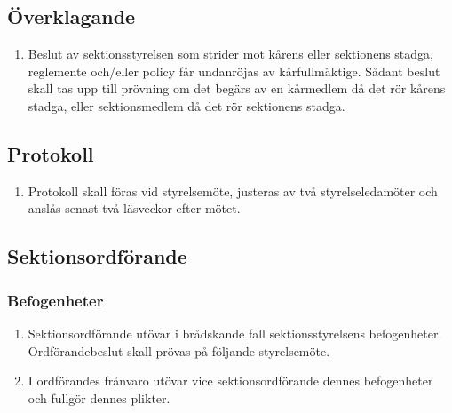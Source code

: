 \documentclass[11pt,a4paper]{article}
\begin{document}
\subsection{Överklagande}

\begin{enumerate}[\thesubsection.1]

  \item Beslut av sektionsstyrelsen som strider mot kårens eller sektionens stadga, reglemente och/eller policy får undanröjas av kårfullmäktige. Sådant beslut skall tas upp till prövning om det begärs av en kårmedlem då det rör kårens stadga, eller sektionsmedlem då det rör sektionens stadga.

\end{enumerate}

\subsection{Protokoll}

\begin{enumerate}[\thesubsection.1]

  \item Protokoll skall föras vid styrelsemöte, justeras av två
  styrelseledamöter och anslås senast två läsveckor efter mötet.

\end{enumerate}



\subsection{Sektionsordförande}

\subsubsection{Befogenheter}

\begin{enumerate}[\thesubsection.1]

  \item Sektionsordförande utövar i brådskande fall sektionsstyrelsens befogenheter. Ordförandebeslut skall prövas på följande styrelsemöte.

  \item I ordförandes frånvaro utövar vice sektionsordförande dennes
  befogenheter och fullgör dennes plikter.

\end{enumerate}
\end{document}
